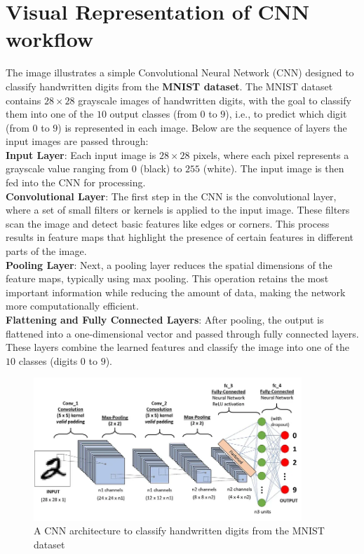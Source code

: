 \section{Visual Representation of CNN workflow}
The image illustrates a simple Convolutional Neural Network (CNN) designed to classify handwritten digits from the \textbf{MNIST dataset}. The MNIST dataset contains $28 \times 28$ grayscale images of handwritten digits, with the goal to classify them into one of the $10$ output classes (from $0$ to $9$), i.e., to predict which digit (from $0$ to $9$) is represented in each image. Below are the sequence of layers the input images are passed through:\\

\textbf{Input Layer}:
Each input image is $28 \times 28$ pixels, where each pixel represents a grayscale value ranging from $0$ (black) to $255$ (white). The input image is then fed into the CNN for processing.\\

\textbf{Convolutional Layer}:
The first step in the CNN is the convolutional layer, where a set of small filters or kernels is applied to the input image. These filters scan the image and detect basic features like edges or corners. This process results in feature maps that highlight the presence of certain features in different parts of the image.\\

\textbf{Pooling Layer}:
Next, a pooling layer reduces the spatial dimensions of the feature maps, typically using max pooling. This operation retains the most important information while reducing the amount of data, making the network more computationally efficient.\\

\textbf{Flattening and Fully Connected Layers}:
After pooling, the output is flattened into a one-dimensional vector and passed through fully connected layers. These layers combine the learned features and classify the image into one of the $10$ classes (digits $0$ to $9$).

\begin{figure}[h!]
    \centering
    \includegraphics[width=0.9\textwidth]{images/figure3.png}
    \caption{A CNN architecture to classify handwritten digits from the MNIST dataset}
    \label{fig:3}
\end{figure}

